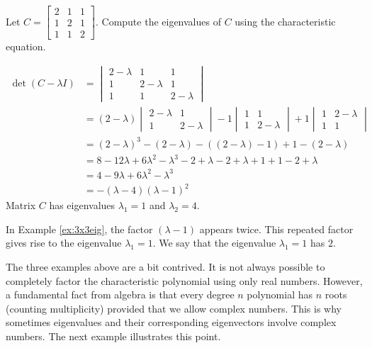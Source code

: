 \documentclass{ximera}
\begin{document}
    
\begin{example}\label{ex:3x3eig}
Let $C=\begin{bmatrix} 2 & 1 & 1\\ 1 & 2 & 1\\ 1 & 1 & 2\end{bmatrix}$.  Compute the eigenvalues of $C$ using the characteristic equation.
\begin{explanation}
\begin{align*}\det(C-\lambda I)&=\begin{vmatrix}2-\lambda & 1 & 1\\ 1 & 2-\lambda & 1\\ 1 & 1 & 2-\lambda\end{vmatrix}\\
&=(2-\lambda)\begin{vmatrix}2-\lambda&1\\1&2-\lambda\end{vmatrix}-1\begin{vmatrix}1&1\\1&2-\lambda\end{vmatrix}+1\begin{vmatrix}1&2-\lambda\\1&1\end{vmatrix}\\
&=(2-\lambda)^3-(2-\lambda)-((2-\lambda)-1)+1-(2-\lambda)\\
&=8-12\lambda+6\lambda^2-\lambda^3-2+\lambda-2+\lambda+1+1-2+\lambda\\
&=4-9\lambda+6\lambda^2-\lambda^3\\
&=-(\lambda-4)(\lambda-1)^2
\end{align*}
Matrix $C$ has eigenvalues $\lambda_1=1$ and $\lambda_2=4$.
\end{explanation}
\end{example}
    
In Example \ref{ex:3x3eig}, the factor  $(\lambda-1)$ appears twice.  This repeated factor gives rise to the eigenvalue $\lambda_1=1$.  We say that the eigenvalue $\lambda_1=1$ has  $2$.
    
The three examples above are a bit contrived.  It is not always possible to completely factor the characteristic polynomial using only real numbers.  However, a fundamental fact from algebra is that every degree $n$ polynomial has $n$ roots (counting multiplicity) provided that we allow complex numbers.  This is why sometimes eigenvalues and their corresponding eigenvectors involve complex numbers.  The next example illustrates this point.
    
\end{document}
